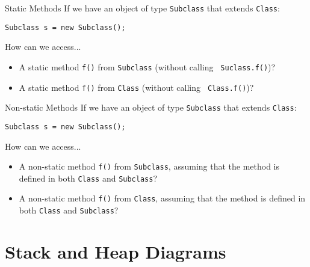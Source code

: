 \documentclass[9pt]{beamer}
\begin{document}
\begin{frame}[fragile]{Static Methods}
  If we have an object of type {\tt Subclass} that extends {\tt Class}:

  \begin{lstlisting}
Subclass s = new Subclass();
  \end{lstlisting}

  How can we access...
  \begin{itemize}
    \item
      A static method {\tt f()} from {\tt Subclass} (without calling {\tt
      Suclass.f()})?

    \item
      A static method {\tt f()} from {\tt Class} (without calling {\tt
      Class.f()})?


 \end{itemize}
\end{frame}


\begin{frame}[fragile]{Non-static Methods}
  If we have an object of type {\tt Subclass} that extends {\tt Class}:

  \begin{lstlisting}
Subclass s = new Subclass();
  \end{lstlisting}

  How can we access...
  \begin{itemize}
    \item
      A non-static method {\tt f()} from {\tt Subclass}, assuming that the
      method is defined in both {\tt Class} and {\tt Subclass}?

    \item
      A non-static method {\tt f()} from {\tt Class}, assuming that the
      method is defined in both {\tt Class} and {\tt Subclass}?

  \end{itemize}
\end{frame}

\section{Stack and Heap Diagrams}
\end{document}
